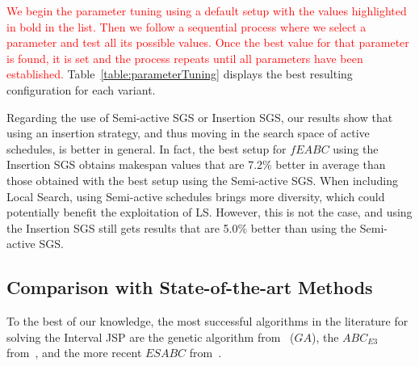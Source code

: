 \documentclass[sn-mathphys]{sn-jnl}%
\theoremstyle{thmstyleone}%
\theoremstyle{thmstyletwo}%
\theoremstyle{thmstylethree}%
\newcommand{\review}[1]{\textcolor{red}{#1}} %
\begin{document}
\review{We begin the parameter tuning using a default setup with the values highlighted in bold in the list. Then we follow a sequential process where we select a parameter and test all its possible values. Once the best value for that parameter is found, it is set and the process repeats until all parameters have been established.} Table~\ref{table:parameterTuning} displays the best resulting configuration for each variant.

\begin{table}[tb]
\small
\centering
\caption{\label{table:parameterTuning} Parameter setup for each variant of $fEABC$}
\end{table}

Regarding the use of Semi-active SGS or Insertion SGS, our results show that using an insertion strategy, and thus moving in the search space of active schedules, is better in general. In fact, the best setup for $fEABC$ using the Insertion SGS obtains makespan values that are 7.2\% better in average than those obtained with the best setup using the Semi-active SGS. When including Local Search, using Semi-active schedules brings more diversity, which could potentially benefit the exploitation of LS. However, this is not the case, and using the Insertion SGS still gets results that are 5.0\% better than using the Semi-active SGS.


\subsection{Comparison with State-of-the-art Methods}
To the best of our knowledge, the most successful algorithms in the literature for solving the Interval JSP are the genetic algorithm from~\cite{Diaz2020genetic} ($GA$), the $ABC_{E3}$ from~\cite{Diaz2022}, and the more recent $ESABC$ from~\cite{Diaz2023-ICAE}.
\end{document}
